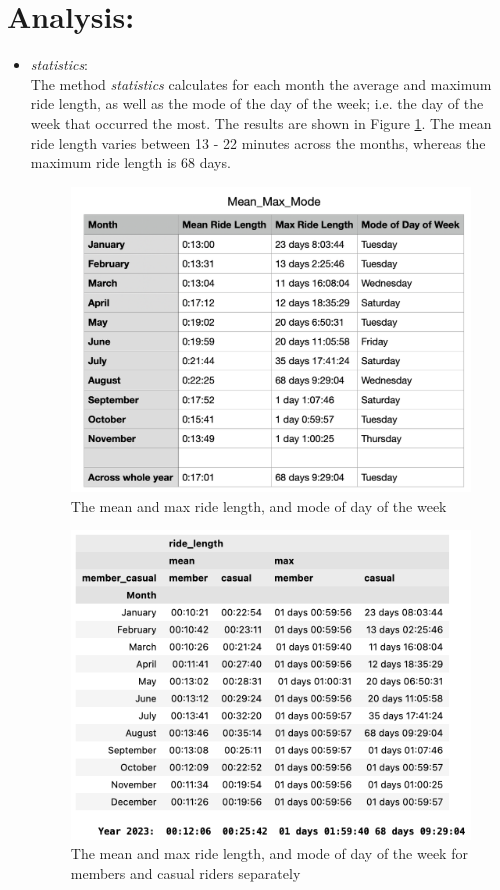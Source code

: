 \documentclass[12pt]{article}
\begin{document}
\section*{Analysis:}
\begin{itemize}
\item \textit{statistics}:\\	
	The method \textit{statistics} calculates for each month the average and maximum ride length, as well as the mode of the day of the week; i.e. the day of the week that occurred the most. The results are shown in Figure \ref{fig9}. The mean ride length varies between 13 - 22 minutes across the months, whereas the maximum ride length is 68 days. 
	
	\begin{figure}[h]
	\centering
	\includegraphics[width=4 in, height = 3.2 in]{imgMeanMax1.png}
	\caption{The mean and max ride length, and mode of day of the week}
	\label{fig9}
	\end{figure}
	
	\begin{figure}[h]
	\centering
	\includegraphics[width=4 in, height = 3.2 in]{imgMeanMax2.png}
	\caption{The mean and max ride length, and mode of day of the week for members and casual riders separately}
	\label{fig10}
	\end{figure}
	
\end{itemize}
\end{document}
